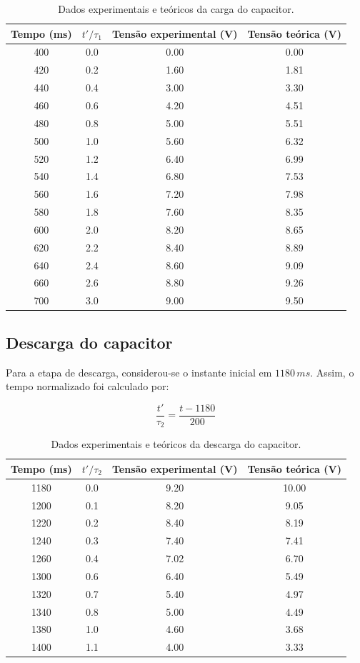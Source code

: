 \documentclass[12pt,a4paper]{article}
\begin{document}
\begin{table}[H]
\centering
\caption{Dados experimentais e teóricos da carga do capacitor.}
\begin{tabular}{|c|c|c|c|}
\hline
Tempo (ms) & $t'/\tau_1$ & Tensão experimental (V) & Tensão teórica (V) \\
\hline
400 & 0.0 & 0.00 & 0.00 \\
420 & 0.2 & 1.60 & 1.81 \\
440 & 0.4 & 3.00 & 3.30 \\
460 & 0.6 & 4.20 & 4.51 \\
480 & 0.8 & 5.00 & 5.51 \\
500 & 1.0 & 5.60 & 6.32 \\
520 & 1.2 & 6.40 & 6.99 \\
540 & 1.4 & 6.80 & 7.53 \\
560 & 1.6 & 7.20 & 7.98 \\
580 & 1.8 & 7.60 & 8.35 \\
600 & 2.0 & 8.20 & 8.65 \\
620 & 2.2 & 8.40 & 8.89 \\
640 & 2.4 & 8.60 & 9.09 \\
660 & 2.6 & 8.80 & 9.26 \\
700 & 3.0 & 9.00 & 9.50 \\
\hline
\end{tabular}
\end{table}

\newpage
\subsection{Descarga do capacitor}

Para a etapa de descarga, considerou-se o instante inicial em $1180\,ms$. Assim, o tempo normalizado foi calculado por:

\begin{calcbox}
\[
\frac{t'}{\tau_2}=\frac{t-1180}{200}
\]
\end{calcbox}

\begin{table}[H]
\centering
\caption{Dados experimentais e teóricos da descarga do capacitor.}
\begin{tabular}{|c|c|c|c|}
\hline
Tempo (ms) & $t'/\tau_2$ & Tensão experimental (V) & Tensão teórica (V) \\
\hline
1180 & 0.0 & 9.20 & 10.00 \\
1200 & 0.1 & 8.20 & 9.05 \\
1220 & 0.2 & 8.40 & 8.19 \\
1240 & 0.3 & 7.40 & 7.41 \\
1260 & 0.4 & 7.02 & 6.70 \\
1300 & 0.6 & 6.40 & 5.49 \\
1320 & 0.7 & 5.40 & 4.97 \\
1340 & 0.8 & 5.00 & 4.49 \\
1380 & 1.0 & 4.60 & 3.68 \\
1400 & 1.1 & 4.00 & 3.33 \\
\hline
\end{tabular}
\end{table}
\end{document}
